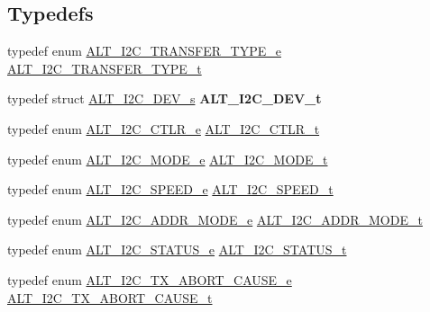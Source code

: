 \subsection*{Typedefs}
\begin{DoxyCompactItemize}
\item 
typedef enum \mbox{\hyperlink{group__ALT__I2C_gab45046fdc6d7cbe49fc048f26fd88719}{A\+L\+T\+\_\+\+I2\+C\+\_\+\+T\+R\+A\+N\+S\+F\+E\+R\+\_\+\+T\+Y\+P\+E\+\_\+e}} \mbox{\hyperlink{group__ALT__I2C_gab9525a902b2ee7ce1ffa4b8f99b75f42}{A\+L\+T\+\_\+\+I2\+C\+\_\+\+T\+R\+A\+N\+S\+F\+E\+R\+\_\+\+T\+Y\+P\+E\+\_\+t}}
\item 
\mbox{\label{group__ALT__I2C_gadc20577390424fdf00139156643216cb}} 
typedef struct \mbox{\hyperlink{structALT__I2C__DEV__s}{A\+L\+T\+\_\+\+I2\+C\+\_\+\+D\+E\+V\+\_\+s}} {\bfseries A\+L\+T\+\_\+\+I2\+C\+\_\+\+D\+E\+V\+\_\+t}
\item 
typedef enum \mbox{\hyperlink{group__ALT__I2C_ga01201dba4856c4a6fcf418d24b5d809a}{A\+L\+T\+\_\+\+I2\+C\+\_\+\+C\+T\+L\+R\+\_\+e}} \mbox{\hyperlink{group__ALT__I2C_ga1db51a8ca7c78d287a620a1f894ba1c5}{A\+L\+T\+\_\+\+I2\+C\+\_\+\+C\+T\+L\+R\+\_\+t}}
\item 
typedef enum \mbox{\hyperlink{group__ALT__I2C_gacf173458ee847bebf75871c319aab2af}{A\+L\+T\+\_\+\+I2\+C\+\_\+\+M\+O\+D\+E\+\_\+e}} \mbox{\hyperlink{group__ALT__I2C_ga15e9cb79693e43e74075112b2aebe1e2}{A\+L\+T\+\_\+\+I2\+C\+\_\+\+M\+O\+D\+E\+\_\+t}}
\item 
typedef enum \mbox{\hyperlink{group__ALT__I2C_gad65b1b276561735ec5613ae1b1a000b7}{A\+L\+T\+\_\+\+I2\+C\+\_\+\+S\+P\+E\+E\+D\+\_\+e}} \mbox{\hyperlink{group__ALT__I2C_ga1601b0e27fb2a82170d10b4f6bdedbf6}{A\+L\+T\+\_\+\+I2\+C\+\_\+\+S\+P\+E\+E\+D\+\_\+t}}
\item 
typedef enum \mbox{\hyperlink{group__ALT__I2C_ga9f24389b4997825c99f8e6f8846be810}{A\+L\+T\+\_\+\+I2\+C\+\_\+\+A\+D\+D\+R\+\_\+\+M\+O\+D\+E\+\_\+e}} \mbox{\hyperlink{group__ALT__I2C_gacaf56449440abffe69a7941f24f9bf5b}{A\+L\+T\+\_\+\+I2\+C\+\_\+\+A\+D\+D\+R\+\_\+\+M\+O\+D\+E\+\_\+t}}
\item 
typedef enum \mbox{\hyperlink{group__ALT__I2C_ga229c6d995595615ca923ecc8b6490603}{A\+L\+T\+\_\+\+I2\+C\+\_\+\+S\+T\+A\+T\+U\+S\+\_\+e}} \mbox{\hyperlink{group__ALT__I2C_gaff6fbc8f47536dd27035588f0ea138fe}{A\+L\+T\+\_\+\+I2\+C\+\_\+\+S\+T\+A\+T\+U\+S\+\_\+t}}
\item 
typedef enum \mbox{\hyperlink{group__ALT__I2C_ga321dbe61df714c442640f1c4a908aabf}{A\+L\+T\+\_\+\+I2\+C\+\_\+\+T\+X\+\_\+\+A\+B\+O\+R\+T\+\_\+\+C\+A\+U\+S\+E\+\_\+e}} \mbox{\hyperlink{group__ALT__I2C_gae7ca3bb5e96b3425588a975987407738}{A\+L\+T\+\_\+\+I2\+C\+\_\+\+T\+X\+\_\+\+A\+B\+O\+R\+T\+\_\+\+C\+A\+U\+S\+E\+\_\+t}}

\end{DoxyCompactItemize}
